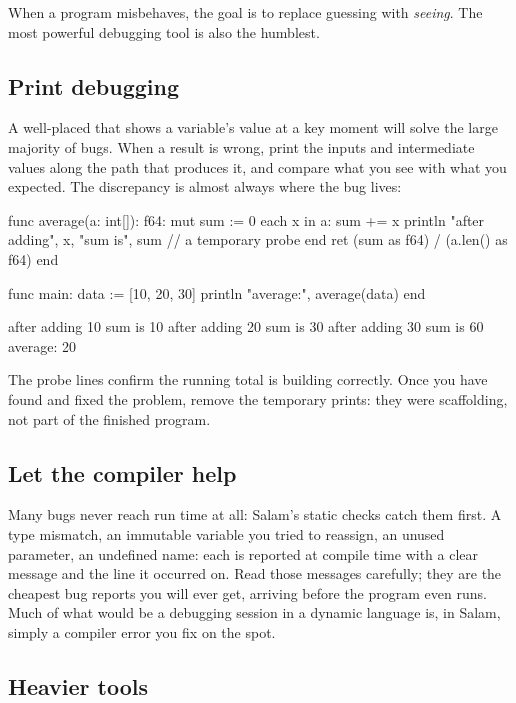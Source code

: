 When a program misbehaves, the goal is to replace guessing with \emph{seeing}. The
most powerful debugging tool is also the humblest.

\subsection{Print debugging}

A well-placed  that shows a variable's value at a key moment will
solve the large majority of bugs. When a result is wrong, print the inputs and
intermediate values along the path that produces it, and compare what you see with
what you expected. The discrepancy is almost always where the bug lives:

\begin{salamen}
func average(a: int[]): f64:
    mut sum := 0
    each x in a:
        sum += x
        println "after adding", x, "sum is", sum    // a temporary probe
    end
    ret (sum as f64) / (a.len() as f64)
end

func main:
    data := [10, 20, 30]
    println "average:", average(data)
end
\end{salamen}

\begin{progout}
after adding 10 sum is 10
after adding 20 sum is 30
after adding 30 sum is 60
average: 20
\end{progout}

The probe lines confirm the running total is building correctly. Once you have
found and fixed the problem, remove the temporary prints: they were scaffolding,
not part of the finished program.

\subsection{Let the compiler help}

Many bugs never reach run time at all: Salam's static checks catch them first. A
type mismatch, an immutable variable you tried to reassign, an unused parameter, an
undefined name: each is reported at compile time with a clear message and the
line it occurred on. Read those messages carefully; they are the cheapest bug
reports you will ever get, arriving before the program even runs. Much of what
would be a debugging session in a dynamic language is, in Salam, simply a compiler
error you fix on the spot.

\subsection{Heavier tools}

